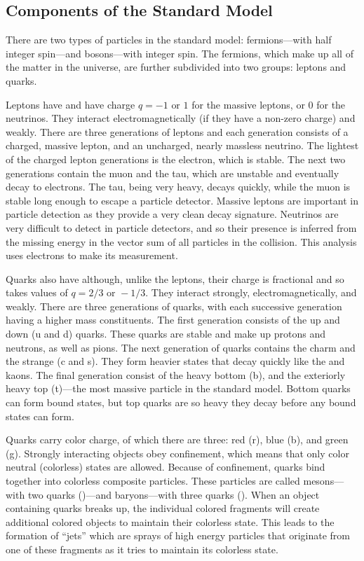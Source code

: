 \subsection{Components of the Standard Model}

There are two types of particles in the standard model: fermions---with half
integer spin---and bosons---with integer spin. The fermions, which make up all
of the matter in the universe, are further subdivided into two groups: leptons
and quarks.

Leptons have \spinhalf and have charge $q=-1 \text{ or } 1$ for the massive
leptons, or 0 for the neutrinos. They interact electromagnetically (if they
have a non-zero charge) and weakly. There are three generations of leptons and
each generation consists of a charged, massive lepton, and an uncharged, nearly
massless neutrino. The lightest of the charged lepton generations is the
electron, which is stable. The next two generations contain the muon and the
tau, which are unstable and eventually decay to electrons. The tau, being very
heavy, decays quickly, while the muon is stable long enough to escape a
particle detector. Massive leptons are important in particle detection as they
provide a very clean decay signature. Neutrinos are very difficult to detect in
particle detectors, and so their presence is inferred from the missing energy
in the vector sum of all particles in the collision. This analysis uses
electrons to make its measurement.

Quarks also have \spinhalf although, unlike the leptons, their charge is
fractional and so takes values of $q = 2/3 \text{ or } -1/3$. They interact
strongly, electromagnetically, and weakly. There are three generations of
quarks, with each successive generation having a higher mass constituents. The
first generation consists of the up and down (u and d) quarks. These quarks are
stable and make up protons and neutrons, as well as pions. The next generation
of quarks contains the charm and the strange (c and s). They form heavier
states that decay quickly like the \jpsi and kaons. The final generation
consist of the heavy bottom (b), and the exteriorly heavy top (t)---the most
massive particle in the standard model. Bottom quarks can form bound states,
but top quarks are so heavy they decay before any bound states can form.

Quarks carry color charge, of which there are three: red (r),
blue (b), and green (g). Strongly interacting objects obey confinement, which
means that only color neutral (colorless) states are allowed. Because of
confinement, quarks bind together into colorless composite particles. These
particles are called mesons---with two quarks (\qqbar)---and baryons---with
three quarks (\baryon). When an object containing quarks breaks up, the
individual colored fragments will create additional colored objects to maintain
their colorless state. This leads to the formation of ``jets'' which are sprays
of high energy particles that originate from one of these fragments as it tries
to maintain its colorless state.

